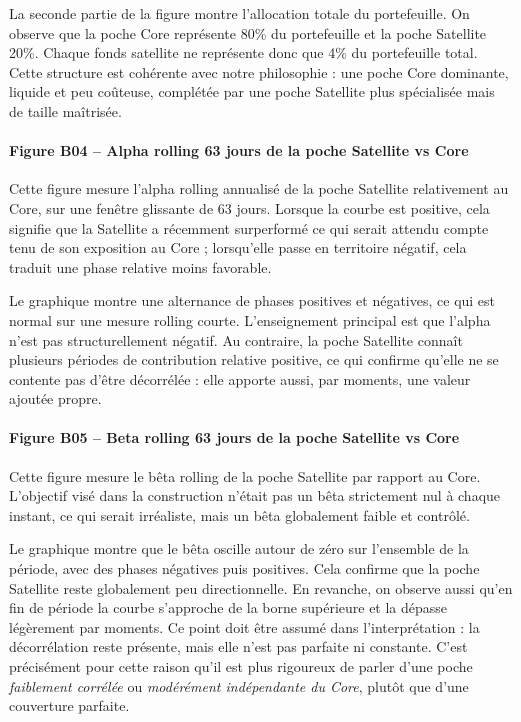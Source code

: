 \documentclass{article}
\begin{document}
La seconde partie de la figure montre l’allocation totale du portefeuille. On observe que la poche Core représente 80\% du portefeuille et la poche Satellite 20\%. Chaque fonds satellite ne représente donc que 4\% du portefeuille total. Cette structure est cohérente avec notre philosophie : une poche Core dominante, liquide et peu coûteuse, complétée par une poche Satellite plus spécialisée mais de taille maîtrisée.

\paragraph{Figure B04 -- Alpha rolling 63 jours de la poche Satellite vs Core}
Cette figure mesure l’alpha rolling annualisé de la poche Satellite relativement au Core, sur une fenêtre glissante de 63 jours. Lorsque la courbe est positive, cela signifie que la Satellite a récemment surperformé ce qui serait attendu compte tenu de son exposition au Core ; lorsqu’elle passe en territoire négatif, cela traduit une phase relative moins favorable.

Le graphique montre une alternance de phases positives et négatives, ce qui est normal sur une mesure rolling courte. L’enseignement principal est que l’alpha n’est pas structurellement négatif. Au contraire, la poche Satellite connaît plusieurs périodes de contribution relative positive, ce qui confirme qu’elle ne se contente pas d’être décorrélée : elle apporte aussi, par moments, une valeur ajoutée propre.

\paragraph{Figure B05 -- Beta rolling 63 jours de la poche Satellite vs Core}
Cette figure mesure le bêta rolling de la poche Satellite par rapport au Core. L’objectif visé dans la construction n’était pas un bêta strictement nul à chaque instant, ce qui serait irréaliste, mais un bêta globalement faible et contrôlé.

Le graphique montre que le bêta oscille autour de zéro sur l’ensemble de la période, avec des phases négatives puis positives. Cela confirme que la poche Satellite reste globalement peu directionnelle. En revanche, on observe aussi qu’en fin de période la courbe s’approche de la borne supérieure et la dépasse légèrement par moments. Ce point doit être assumé dans l’interprétation : la décorrélation reste présente, mais elle n’est pas parfaite ni constante. C’est précisément pour cette raison qu’il est plus rigoureux de parler d’une poche \emph{faiblement corrélée} ou \emph{modérément indépendante du Core}, plutôt que d’une couverture parfaite.
\end{document}
